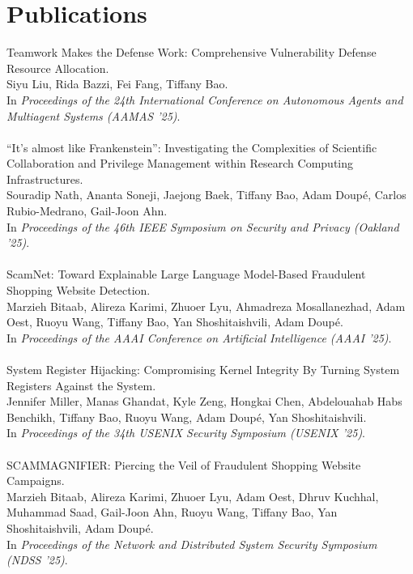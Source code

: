 \section{Publications}
Teamwork Makes the Defense Work: Comprehensive Vulnerability Defense Resource Allocation. \\
Siyu Liu, Rida Bazzi, Fei Fang, Tiffany Bao. \\
In \emph{Proceedings of the 24th International Conference on Autonomous Agents and Multiagent Systems (AAMAS '25)}.
\\\\
``It's almost like Frankenstein'': Investigating the Complexities of Scientific Collaboration and Privilege Management within Research Computing Infrastructures. \\
Souradip Nath, Ananta Soneji, Jaejong Baek, Tiffany Bao, Adam Doup\'{e}, Carlos Rubio-Medrano, Gail-Joon Ahn. \\
In \emph{Proceedings of the 46th IEEE Symposium on Security and Privacy (Oakland '25)}.
\\\\
ScamNet: Toward Explainable Large Language Model-Based Fraudulent Shopping Website Detection. \\
Marzieh Bitaab, Alireza Karimi, Zhuoer Lyu, Ahmadreza Mosallanezhad, Adam Oest, Ruoyu Wang, Tiffany Bao, Yan Shoshitaishvili, Adam Doup\'{e}. \\
In \emph{Proceedings of the AAAI Conference on Artificial Intelligence (AAAI '25)}.
\\\\
System Register Hijacking: Compromising Kernel Integrity By Turning System Registers Against the System. \\
Jennifer Miller, Manas Ghandat, Kyle Zeng, Hongkai Chen, Abdelouahab Habs Benchikh, Tiffany Bao, Ruoyu Wang, Adam Doup\'{e}, Yan Shoshitaishvili. \\
In \emph{Proceedings of the 34th USENIX Security Symposium (USENIX '25)}.
\\\\
SCAMMAGNIFIER: Piercing the Veil of Fraudulent Shopping Website Campaigns. \\
Marzieh Bitaab, Alireza Karimi, Zhuoer Lyu, Adam Oest, Dhruv Kuchhal, Muhammad Saad, Gail-Joon Ahn, Ruoyu Wang, Tiffany Bao, Yan Shoshitaishvili, Adam Doup\'{e}. \\
In \emph{Proceedings of the Network and Distributed System Security Symposium (NDSS '25)}.
\\\\
